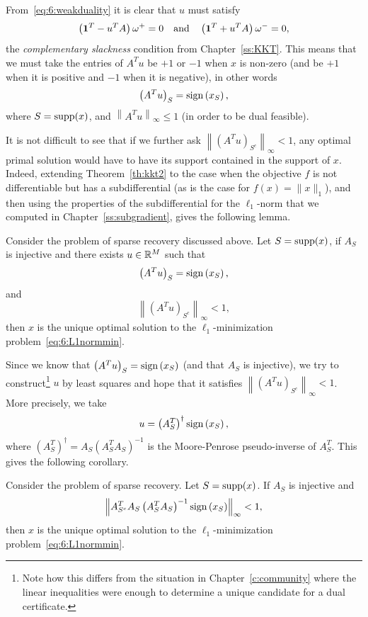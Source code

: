 From~\eqref{eq:6:weakduality} it is clear that $u$ must satisfy 
$$\left( \mathbf{1}^T - u^TA \right) \omega^{+} =0 \quad \text{and} \quad \left( \mathbf{1}^T + u^TA \right) \omega^{-} = 0,$$ the \emph{complementary slackness} condition from Chapter~\ref{ss:KKT}. This means that we must take the entries of $A^Tu$ be $+1$ or $-1$ when $x$ is non-zero (and be $+1$ when it is positive and $-1$ when it is negative), in other words
\[
\left( A^Tu\right)_S = \operatorname{sign}\left(x_S\right),
\]
where $S = \operatorname{supp}(x)$, and $\left\| A^Tu\right\|_\infty \leq 1$ (in order to be dual feasible).


\begin{remark}\label{remark:6:uniquenessofCSsol}
It is not difficult to see that if we further ask $\left\| \left( A^Tu\right)_{S^c}\right\|_\infty < 1$, any optimal primal solution would have to have its support contained in the support of $x$. Indeed,  extending Theorem~\ref{th:kkt2} to the case when the objective $f$ is not differentiable but has a subdifferential (as is the case for $f(x) = \|x\|_1$), and then using the properties of the subdifferential for the $\ell_1$-norm that we computed in Chapter~\ref{ss:subgradient},
gives the following lemma.
\end{remark}

\begin{lemma}\label{le:csdual}
Consider the problem of sparse recovery discussed above. Let $S = \operatorname{supp}(x)$, if $A_S$ is injective and there exists $u\in\mathbb{R}^{M}$ such that
\[
\left( A^Tu\right)_S = \operatorname{sign}\left(x_S\right),
\]
and
\[
\left\| \left( A^Tu\right)_{S^c}\right\|_\infty < 1,
\]
then $x$ is the unique optimal solution to the $\ell_1$-minimization problem~\eqref{eq:6:L1normmin}.
\end{lemma}



Since we know that $\left( A^Tu\right)_S = \operatorname{sign}\left(x_S\right)$ (and that $A_S$ is injective), we try to construct\footnote{Note how this differs from the situation in Chapter~\ref{c:community} where the linear inequalities were enough to determine a unique candidate for a dual certificate.} $u$ by least squares and hope that it satisfies $\left\| \left( A^Tu\right)_{S^c}\right\|_\infty < 1$. More precisely, we take
\[
u = \left( A^T_S \right)^\dagger \operatorname{sign}\left(x_S\right),
\]
where $\left( A^T_S \right)^\dagger = A_S \left( A_S^TA_S \right)^{-1}$ is the Moore-Penrose pseudo-inverse of $A^T_S$. This gives the following corollary.

\begin{corollary}\label{cor:6:dualcertificate}
Consider the problem of sparse recovery.  Let $S = \operatorname{supp}(x)$. If $A_S$ is injective and
\[
\left\| A_{S^c}^T A_S \left( A_S^TA_S \right)^{-1} \operatorname{sign}\left(x_S\right) \right\|_\infty < 1,
\]
then $x$ is the unique optimal solution to the $\ell_1$-minimization problem~\eqref{eq:6:L1normmin}.
\end{corollary}




